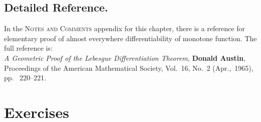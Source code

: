 \subsection{Detailed Reference.}

In the \textsc{Notes and Comments} appendix for this chapter,
there is a reference for elementary proof of almost everywhere
differentiability of monotone function.
The full reference is:\\
\emph{A Geometric Proof of the Lebesgue Differentiation Theorem},
\textbf{Donald Austin},
Proceedings of the American Mathematical Society, 
Vol.~16, No.~2 (Apr.,~1965), pp.~ 220--221.


\section{Exercises} %

